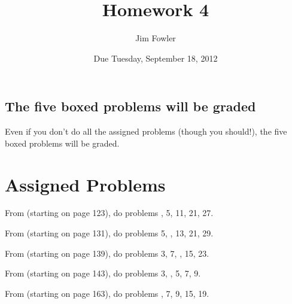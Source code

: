 \documentclass[12pt]{handout}
\title{Homework 4}
\date{Due Tuesday, September 18, 2012}
\author{Jim Fowler}
\begin{document}
\maketitle










\subsection*{The five boxed problems will be graded}
Even if you don't do all the assigned problems (though you should!), the five boxed problems will be graded.

\section*{Assigned Problems}

From  (starting on page 123),
do problems , 5, 11, 21, 27.
\vspace{1ex}

From  (starting on page 131),
do problems 5, , 13, 21, 29.
\vspace{1ex}

From  (starting on page 139),
do problems 3, 7, , 15, 23.
\vspace{1ex}

From  (starting on page 143),
do problems 3, , 5, 7, 9.
\vspace{1ex}

From  (starting on page 163),
do problems , 7, 9, 15, 19.
\vspace{1ex}
\end{document}
